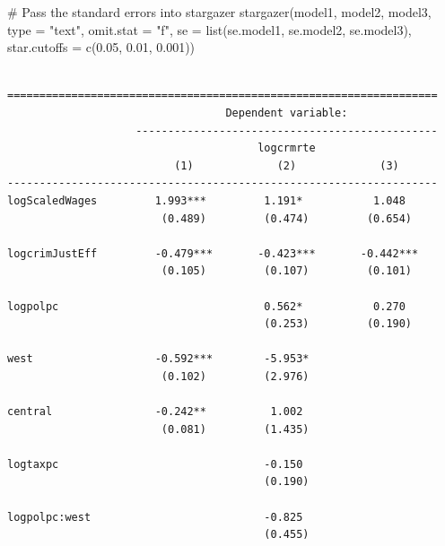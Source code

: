 \documentclass[]{article}
\newenvironment{Shaded}{}{}
\newcommand{\CommentTok}[1]{\textcolor[rgb]{0.00,0.50,0.00}{#1}}
\newcommand{\DataTypeTok}[1]{#1}
\newcommand{\FloatTok}[1]{#1}
\newcommand{\KeywordTok}[1]{\textcolor[rgb]{0.00,0.00,1.00}{#1}}
\newcommand{\NormalTok}[1]{#1}
\newcommand{\StringTok}[1]{\textcolor[rgb]{0.00,0.50,0.50}{#1}}
\begin{document}
\begin{Shaded}
\begin{Highlighting}[]
\CommentTok{# Pass the standard errors into stargazer}
\KeywordTok{stargazer}\NormalTok{(model1, model2, model3, }\DataTypeTok{type =} \StringTok{"text"}\NormalTok{, }\DataTypeTok{omit.stat =} \StringTok{"f"}\NormalTok{,}
          \DataTypeTok{se =} \KeywordTok{list}\NormalTok{(se.model1, se.model2, se.model3),}
          \DataTypeTok{star.cutoffs =} \KeywordTok{c}\NormalTok{(}\FloatTok{0.05}\NormalTok{, }\FloatTok{0.01}\NormalTok{, }\FloatTok{0.001}\NormalTok{))}
\end{Highlighting}
\end{Shaded}

\begin{verbatim}

===================================================================
                                  Dependent variable:              
                    -----------------------------------------------
                                       logcrmrte                   
                          (1)             (2)             (3)      
-------------------------------------------------------------------
logScaledWages         1.993***         1.191*           1.048     
                        (0.489)         (0.474)         (0.654)    
                                                                   
logcrimJustEff         -0.479***       -0.423***       -0.442***   
                        (0.105)         (0.107)         (0.101)    
                                                                   
logpolpc                                0.562*           0.270     
                                        (0.253)         (0.190)    
                                                                   
west                   -0.592***        -5.953*                    
                        (0.102)         (2.976)                    
                                                                   
central                -0.242**          1.002                     
                        (0.081)         (1.435)                    
                                                                   
logtaxpc                                -0.150                     
                                        (0.190)                    
                                                                   
logpolpc:west                           -0.825                     
                                        (0.455)                    
                                                                   

\end{verbatim}
\end{document}
